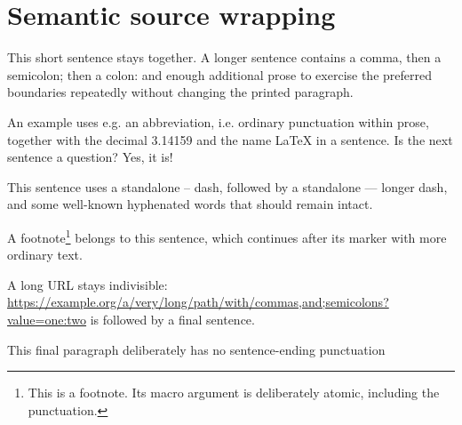 \documentclass{article}
\begin{document}
\section{Semantic source wrapping}
This short sentence stays together. A longer sentence contains a comma, then a semicolon; then a colon: and enough additional prose to exercise the preferred boundaries repeatedly without changing the printed paragraph.

An example uses e.g. an abbreviation, i.e. ordinary punctuation within prose, together with the decimal 3.14159 and the name \LaTeX{} in a sentence. Is the next sentence a question? Yes, it is!

This sentence uses a standalone -- dash, followed by a standalone --- longer dash, and some well-known hyphenated words that should remain intact.

\begin{abstract}
Short sentence. A longer sentence inside an indented environment has punctuation, together with enough words to check continuation widths and indentation.
\end{abstract}

A footnote\footnote{This is a footnote. Its macro argument is deliberately atomic, including the punctuation.} belongs to this sentence, which continues after its marker with more ordinary text.

A long URL stays indivisible: \url{https://example.org/a/very/long/path/with/commas,and;semicolons?value=one:two} is followed by a final sentence.

This final paragraph deliberately has no sentence-ending punctuation
\end{document}
